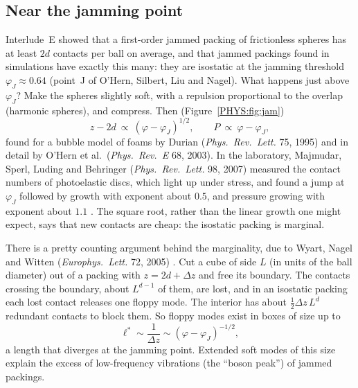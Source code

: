 \documentclass[11pt,openany]{book}
\theoremstyle{plain}
\theoremstyle{definition}
\theoremstyle{remark}
\begin{document}
\subsection*{Near the jamming point}
Interlude~E showed that a first-order jammed packing of frictionless spheres has at least $2d$ contacts
per ball on average, and that jammed packings found in simulations have exactly this many: they are
isostatic at the jamming threshold $\varphi_J\approx0.64$ (point~J of O'Hern, Silbert, Liu and Nagel). What
happens just above $\varphi_J$? Make the spheres slightly soft, with a repulsion proportional to the overlap
(harmonic spheres), and compress. Then (Figure~\ref{PHYS:fig:jam}) 
\[
  z-2d\ \propto\ (\varphi-\varphi_J)^{1/2},\qquad P\ \propto\ \varphi-\varphi_J ,
\]
found for a bubble model of foams by Durian (\emph{Phys.\ Rev.\ Lett.} 75, 1995) and in detail by O'Hern et
al.\ (\emph{Phys.\ Rev.~E} 68, 2003). In the laboratory, Majmudar, Sperl, Luding and Behringer
(\emph{Phys.\ Rev.\ Lett.} 98, 2007) measured the contact numbers of photoelastic discs, which light up under
stress, and found a jump at $\varphi_J$ followed by growth with exponent about $0.5$, and pressure growing with
exponent about $1.1$ . The square root, rather than the linear growth one might expect, says
that new contacts are cheap: the isostatic packing is marginal.

There is a pretty counting argument behind the marginality, due to Wyart, Nagel and Witten
(\emph{Europhys.\ Lett.} 72, 2005) . Cut a cube of side $L$ (in units of the ball diameter)
out of a packing with $z=2d+\Delta z$ and free its boundary. The contacts crossing the boundary, about
$L^{d-1}$ of them, are lost, and in an isostatic packing each lost contact releases one floppy mode. The
interior has about $\frac12\Delta z\,L^d$ redundant contacts to block them. So floppy modes exist in boxes
of size up to
\[
  \ell^*\sim\frac1{\Delta z}\sim(\varphi-\varphi_J)^{-1/2},
\]
a length that diverges at the jamming point. Extended soft modes of this size explain the excess of
low-frequency vibrations (the ``boson peak'') of jammed packings.
\end{document}
